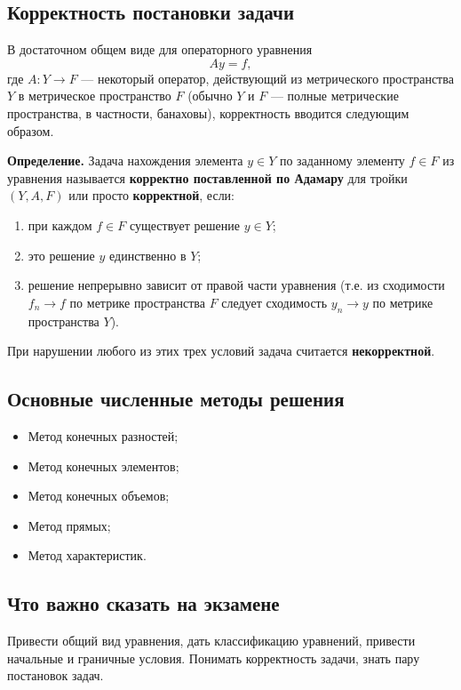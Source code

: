 \subsection{Корректность постановки задачи}

В достаточном общем виде для операторного уравнения  
$$ A y = f, $$ 
где \( A : Y \to F \) — некоторый оператор, действующий из метрического пространства \( Y \) в метрическое пространство \( F \) (обычно \( Y \) и \( F \) — полные метрические пространства, в частности, банаховы), корректность вводится следующим образом.  

\textbf{Определение.} 
Задача нахождения элемента \( y \in Y \) по заданному элементу \( f \in F \) из уравнения называется \textbf{корректно поставленной по Адамару} для тройки \( (Y, A, F) \) или просто \textbf{корректной}, если:
\begin{enumerate}
	\item при каждом \( f \in F \) существует решение \( y \in Y \);
	\item это решение \( y \) единственно в \( Y \);
	\item решение непрерывно зависит от правой части уравнения (т.е. из сходимости \( f_n \to f \) по метрике пространства \( F \) следует сходимость \( y_n \to y \) по метрике пространства \( Y \)). 
\end{enumerate}

При нарушении любого из этих трех условий задача считается \textbf{некорректной}.

\subsection{Основные численные методы решения}
\begin{itemize}
	\item Метод конечных разностей;
	\item Метод конечных элементов;
	\item Метод конечных объемов;
	\item Метод прямых;
	\item Метод характеристик.
\end{itemize}

\subsection{Что важно сказать на экзамене}

Привести общий вид уравнения, дать классификацию уравнений, привести начальные и граничные условия. Понимать корректность задачи, знать пару постановок задач.

\newpage